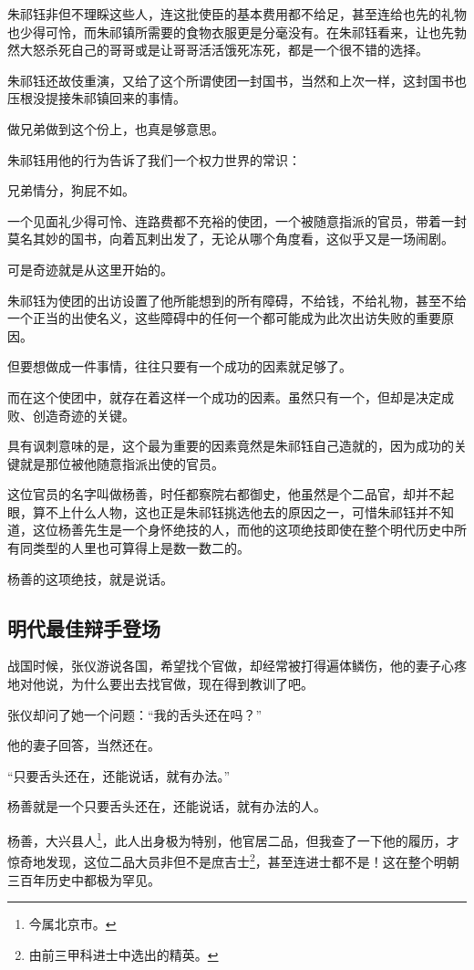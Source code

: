 \begin{multicols}{\theparacolNo}
朱祁钰非但不理睬这些人，连这批使臣的基本费用都不给足，甚至连给也先的礼物也少得可怜，而朱祁镇所需要的食物衣服更是分毫没有。在朱祁钰看来，让也先勃然大怒杀死自己的哥哥或是让哥哥活活饿死冻死，都是一个很不错的选择。

朱祁钰还故伎重演，又给了这个所谓使团一封国书，当然和上次一样，这封国书也压根没提接朱祁镇回来的事情。

做兄弟做到这个份上，也真是够意思。

朱祁钰用他的行为告诉了我们一个权力世界的常识：

兄弟情分，狗屁不如。

一个见面礼少得可怜、连路费都不充裕的使团，一个被随意指派的官员，带着一封莫名其妙的国书，向着瓦剌出发了，无论从哪个角度看，这似乎又是一场闹剧。

可是奇迹就是从这里开始的。

朱祁钰为使团的出访设置了他所能想到的所有障碍，不给钱，不给礼物，甚至不给一个正当的出使名义，这些障碍中的任何一个都可能成为此次出访失败的重要原因。

但要想做成一件事情，往往只要有一个成功的因素就足够了。

而在这个使团中，就存在着这样一个成功的因素。虽然只有一个，但却是决定成败、创造奇迹的关键。

具有讽刺意味的是，这个最为重要的因素竟然是朱祁钰自己造就的，因为成功的关键就是那位被他随意指派出使的官员。

这位官员的名字叫做杨善，时任都察院右都御史，他虽然是个二品官，却并不起眼，算不上什么人物，这也正是朱祁钰挑选他去的原因之一，可惜朱祁钰并不知道，这位杨善先生是一个身怀绝技的人，而他的这项绝技即使在整个明代历史中所有同类型的人里也可算得上是数一数二的。

杨善的这项绝技，就是说话。

\subsection{明代最佳辩手登场}
战国时候，张仪游说各国，希望找个官做，却经常被打得遍体鳞伤，他的妻子心疼地对他说，为什么要出去找官做，现在得到教训了吧。

张仪却问了她一个问题：“我的舌头还在吗？”

他的妻子回答，当然还在。

“只要舌头还在，还能说话，就有办法。”

杨善就是一个只要舌头还在，还能说话，就有办法的人。

杨善，大兴县人\footnote{今属北京市。}，此人出身极为特别，他官居二品，但我查了一下他的履历，才惊奇地发现，这位二品大员非但不是庶吉士\footnote{由前三甲科进士中选出的精英。}，甚至连进士都不是！这在整个明朝三百年历史中都极为罕见。


\end{multicols}
